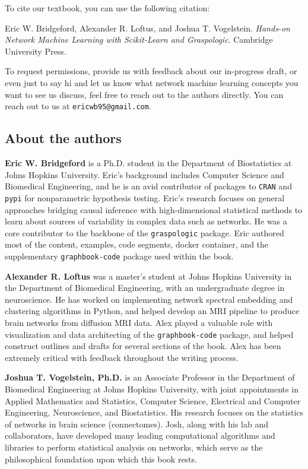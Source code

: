 To cite our textbook, you can use the following citation: 

Eric W. Bridgeford, Alexander R. Loftus, and Joshua T. Vogelstein. \emph{Hands-on Network Machine Learning with Scikit-Learn and Graspologic}. Cambridge University Press.

To request permissions, provide us with feedback about our in-progress draft, or even just to say hi and let us know what network machine learning concepts you want to see us discuss, feel free to reach out to the authors directly. You can reach out to us at \texttt{ericwb95@gmail.com}.

\subsection*{About the authors}

\textbf{Eric W. Bridgeford} is a Ph.D. student in the Department of Biostatistics at Johns Hopkins University. Eric’s background includes Computer Science and Biomedical Engineering, and he is an avid contributor of packages to \texttt{CRAN} and \texttt{pypi} for nonparametric hypothesis testing. Eric's research focuses on general approaches bridging causal inference with high-dimensional statistical methods to learn about sources of variability in complex data such as networks. He was a core contributor to the backbone of the \texttt{graspologic} package. Eric authored most of the content, examples, code segments, docker container, and the supplementary \texttt{graphbook-code} package used within the book.

\noindent\textbf{Alexander R. Loftus} was a master’s student at Johns Hopkins University in the Department of Biomedical Engineering, with an undergraduate degree in neuroscience. He has worked on implementing network spectral embedding and clustering algorithms in Python, and helped develop an MRI pipeline to produce brain networks from diffusion MRI data. Alex played a valuable role with visualization and data architecting of the \texttt{graphbook-code} package, and helped construct outlines and drafts for several sections of the book. Alex has been extremely critical with feedback throughout the writing process.

\noindent\textbf{Joshua T. Vogelstein, Ph.D.} is an Associate Professor in the Department of Biomedical Engineering at Johns Hopkins University, with joint appointments in Applied Mathematics and Statistics, Computer Science, Electrical and Computer Engineering, Neuroscience, and Biostatistics. His research focuses on the statistics of networks in brain science (connectomes). Josh, along with his lab and collaborators, have developed many leading computational algorithms and libraries to perform statistical analysis on networks, which serve as the philosophical foundation upon which this book rests. 

